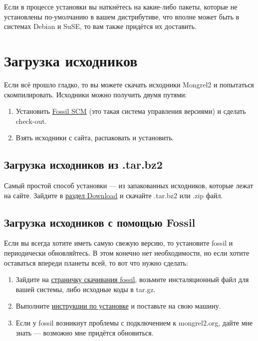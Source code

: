 Если в процессе установки вы наткнётесь на какие-либо пакеты, которые
не установлены по-умолчанию в вашем дистрибутиве, что вполне может быть
в системах Debian и SuSE, то вам также придётся их доставить.

\section{Загрузка исходников}

Если всё прошло гладко, то вы можете скачать исходники Mongrel2 и
попытаться скомпилировать. Исходники можно получить двумя путями:

\begin{enumerate}
\item Установить \href{http://fossil-scm.org}{Fossil SCM} (это такая система управления версиями) и сделать check-out.
\item Взять исходники с сайта, распаковать и установить.
\end{enumerate}

\subsection{Загрузка исходников из .tar.bz2}

Самый простой способ установки --- из запакованных исходников, которые лежат на сайте.
Зайдите в \href{http://mongrel2.org/home#download}{раздел Download} и скачайте .tar.bz2 или .zip файл.

\subsection{Загрузка исходников с помощью Fossil}

Если вы всегда хотите иметь самую свежую
версию, то установите fossil и периодически обновляйтесь. В этом конечно нет
необходимости, но если хотите оставаться впереди планеты всей, то вот что нужно сделать:

\begin{enumerate}
\item Зайдите на \href{http://www.fossil-scm.org/download.html}{страничку скачивания fossil},
    возьмите инсталяционный файл для вашей системы, либо исходные коды в tar.gz. 
\item Выполните \href{http://fossil-scm.org/index.html/doc/tip/www/build.wiki}{инструкции по установке}
    и поставьте на свою машину.
\item Если у fossil возникнут проблемы с подключением к mongrel2.org, дайте мне знать ---
    возможно мне придётся обновиться.
\end{enumerate}

